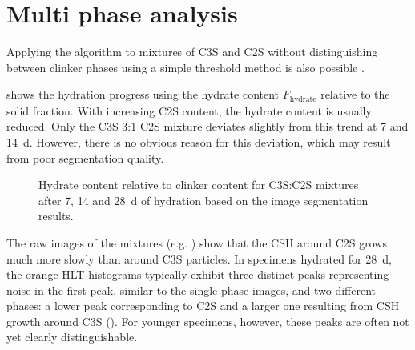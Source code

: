 \FloatBarrier
\section{Multi phase analysis}
\label{sec:HLT_multi_phase}

Applying the algorithm to mixtures of \ac{C3S} and \ac{C2S} without distinguishing between clinker phases using a simple threshold method is also possible \cite{kleiner.2026b}.

 shows the hydration progress using the hydrate content $F_\text{hydrate}$ relative to the solid fraction.
With increasing \ac{C2S} content, the hydrate content is usually reduced.
Only the \ac{C3S} 3:1 \ac{C2S} mixture deviates slightly from this trend at \num{7} and \qty{14}{\day}.
However, there is no obvious reason for this deviation, which may result from poor segmentation quality.

\begin{figure}[!htb]
	\centering
	\caption{%
		Hydrate content relative to clinker content for \ac{C3S}:\ac{C2S} mixtures after \num{7}, \num{14} and \qty{28}{\day} of hydration based on the image segmentation results.
	}
    \label{fig:hydrate_clinker_stacked_bar_mix}
\end{figure}

The raw images of the mixtures (e.g. ) show that the \ac{CSH} around \ac{C2S} grows much more slowly than around \ac{C3S} particles.
In specimens hydrated for \qty{28}{\day}, the orange \ac{HLT} histograms typically exhibit three distinct peaks representing noise in the first peak, similar to the single-phase images, and two different phases: a lower peak corresponding to \ac{C2S} and a larger one resulting from \ac{CSH} growth around \ac{C3S} ().
For younger specimens, however, these peaks are often not yet clearly distinguishable.

